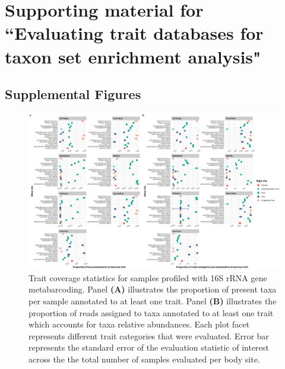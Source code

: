 \chapter{Supporting material for ``Evaluating trait databases for taxon set enrichment analysis"}
\section{Supplemental Figures}

\begin{figure}
    \centering
    \includegraphics[width=\linewidth]{figures/appD_fs1.eps}
    \caption[Trait coverage statistics for samples profiled with 16S rRNA gene metabarcoding]{Trait coverage statistics for samples profiled with 16S rRNA gene metabarcoding. Panel \textbf{(A)} illustrates the proportion of present taxa per sample annotated to at least one trait. Panel \textbf{(B)} illustrates the proportion of reads assigned to taxa annotated to at least one trait which accounts for taxa relative abundances. Each plot facet represents different trait categories that were evaluated. Error bar represents the standard error of the evaluation statistic of interest across the the total number of samples evaluated per body site.}
    \label{fig:d1}
\end{figure}

